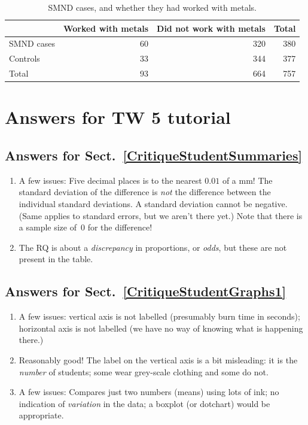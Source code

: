 \documentclass[
  11pt,
  a4paper,
  krantz2]{krantz}
\providecommand{\tightlist}{%
  \setlength{\itemsep}{0pt}\setlength{\parskip}{0pt}}
\begin{document}
\begin{footnotesize}
\begin{table}
\centering
\caption{\label{tab:SMNDAnswerTable}SMND cases, and whether they had worked with metals.}
\centering
\fontsize{8}{10}\selectfont
\begin{tabular}[t]{lrrr}
\toprule
\textbf{ } & \textbf{Worked with metals} & \textbf{Did not work with metals} & \textbf{Total}\\
\midrule
SMND cases & 60 & 320 & 380\\
Controls & 33 & 344 & 377\\
Total & 93 & 664 & 757\\
\bottomrule
\end{tabular}
\end{table}

\section{Answers for TW 5 tutorial}\label{Lecture5Answers}

\subsection*{Answers for Sect.~\ref{CritiqueStudentSummaries}}\label{answers-for-sect.-refcritiquestudentsummaries}

\begin{enumerate}
\def\labelenumi{\arabic{enumi}.}
\tightlist
\item
  A few issues:
  Five decimal places is to the nearest \(0.01\) of a mm!
  The standard deviation of the difference is \emph{not} the difference between the individual standard deviations.
  A standard deviation cannot be negative. (Same applies to standard errors, but we aren't there yet.)
  Note that there is a sample size of~\(0\) for the difference!
\item
  The RQ is about a \emph{discrepancy} in proportions, or \emph{odds}, but these are not present in the table.
\end{enumerate}

\subsection*{Answers for Sect.~\ref{CritiqueStudentGraphs1}}\label{answers-for-sect.-refcritiquestudentgraphs1}

\begin{enumerate}
\def\labelenumi{\arabic{enumi}.}
\tightlist
\item
  A few issues: vertical axis is not labelled (presumably burn time in seconds); horizontal axis is not labelled (we have no way of knowing what is happening there.)
\item
  Reasonably good!
  The label on the vertical axis is a bit misleading: it is the \emph{number} of students; some wear grey-scale clothing and some do not.
\item
  A few issues: Compares just two numbers (means) using lots of ink; no indication of \emph{variation} in the data; a boxplot (or dotchart) would be appropriate.
\end{enumerate}


\end{footnotesize}
\end{document}
